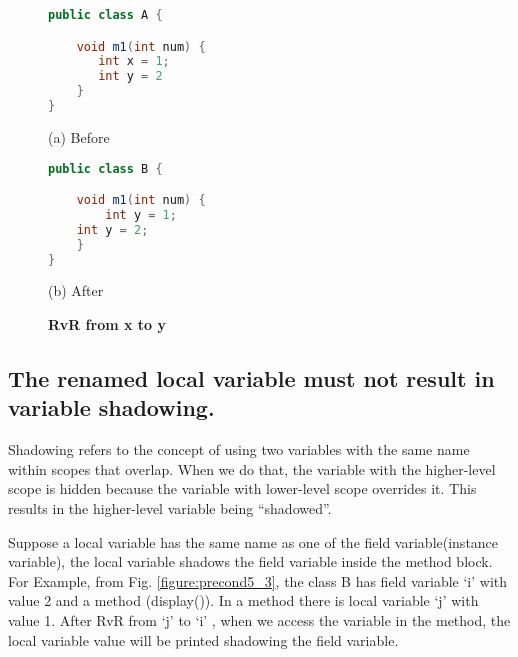 \begin{figure}[th]
\centering
\begin{minipage}[t]{0.45\linewidth}
\begin{lstlisting}[language=java, basicstyle=\scriptsize\ttfamily,frame=single]
public class A {

    void m1(int num) {
       int x = 1; 
       int y = 2
    }
}
\end{lstlisting}
\centering(a) Before 
\end{minipage}
\hfill
\begin{minipage}[t]{0.45\linewidth}
\begin{lstlisting}[language=java, basicstyle=\scriptsize\ttfamily,frame=single]
public class B {

    void m1(int num) {
        int y = 1; 
	int y = 2;
    }
}
\end{lstlisting}
\centering(b) After 
\end{minipage}
\caption{\textbf{RvR from x to y}}
\label{figure:precond5_2}
\end{figure}

\subsection{The renamed local variable must not result in variable shadowing.}
Shadowing refers to the concept of using two variables with the same name within scopes that overlap. When we do that, the variable with the higher-level scope is hidden because the variable with lower-level scope overrides it. This results in the higher-level variable being ``shadowed''. 

Suppose a local variable has the same name as one of the field variable(instance variable), the local variable shadows the field variable inside the method block. For Example, from Fig. \ref{figure:precond5_3},  the class B has  field variable `i' with value 2 and a method (display()). In a method there is local variable `j' with value 1. After RvR from `j' to `i' , when we access the variable in the method, the local variable value will be printed shadowing the field variable.

